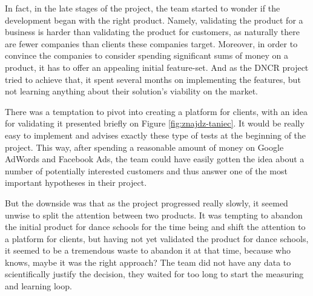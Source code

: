 \documentclass{article}
\begin{document}
In fact, in the late stages of the project, the team started to wonder if the development began with the right product. Namely, validating the product for a business is harder than validating the product for customers, as naturally there are fewer companies than clients these companies target. Moreover, in order to convince the companies to consider spending significant sums of money on a product, it has to offer an appealing initial feature-set. And as the DNCR project tried to achieve that, it spent several months on implementing the features, but not learning anything about their solution's viability on the market.

There was a temptation to pivot into creating a platform for clients, with an idea for validating it presented briefly on Figure \ref{fig:znajdz-taniec}. It would be really easy to implement and \cite{klein2013ux} advises exactly these type of tests at the beginning of the project. This way, after spending a reasonable amount of money on Google AdWords and Facebook Ads, the team could have easily gotten the idea about a number of potentially interested customers and thus answer one of the most important hypotheses in their project.

But the downside was that as the project progressed really slowly, it seemed unwise to split the attention between two products. It was tempting to abandon the initial product for dance schools for the time being and shift the attention to a platform for clients, but having not yet validated the product for dance schools, it seemed to be a tremendous waste to abandon it at that time, because who knows, maybe it was the right approach? The team did not have any data to scientifically justify the decision, they waited for too long to start the measuring and learning loop.
\end{document}
